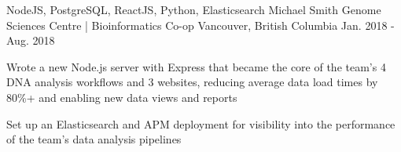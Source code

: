 \begin{cventries}
  \cventry
    {NodeJS, PostgreSQL, ReactJS, Python, Elasticsearch} %
    {Michael Smith Genome Sciences Centre | Bioinformatics Co-op} %
    {Vancouver, British Columbia} %
    {Jan. 2018 - Aug. 2018} %
    {
      \begin{cvitems} %
        \item {Wrote a new Node.js server with Express that became the core of the team’s 4 DNA analysis workflows and 3 websites, reducing average data load times by 80\%+ and enabling new data views and reports}
        \item {Set up an Elasticsearch and APM deployment for visibility into the performance of the team’s data analysis pipelines}
      \end{cvitems}
    }

\end{cventries}
